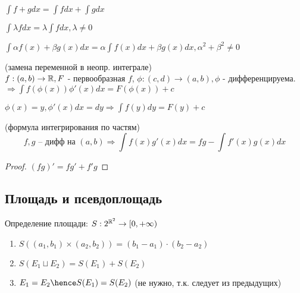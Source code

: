 \begin{properties}
    \item $\int f + g dx = \int f dx + \int g dx$
    
    \item $\int \lambda f dx = \lambda \int f dx, \lambda \neq 0$
        
    \item $\int \alpha f(x) + \beta g(x) dx = \alpha \int f(x) dx + \beta g(x) dx, \alpha^2 + \beta^2 \neq 0$
        
    \item (замена переменной в неопр. интеграле) \\
    $f : (a, b) \rightarrow \mathbb{R}, F$ - первообразная $f$, $\phi:(c, d) \rightarrow (a, b), 
    \phi$ - дифференцируема. \\
    $\Rightarrow \int f(\phi(x))\phi'(x) dx = F(\phi(x)) + c$
    \begin{remark}
        $\phi(x) = y, \phi'(x)dx = dy \Rightarrow \int f(y) dy = F(y) + c$
    \end{remark}

    \item(формула интегрирования по частям) \\
    \[f, g\text{ -- дифф на }(a, b) \Rightarrow \int f(x)g'(x)dx = fg - \int f'(x)g(x)dx\]
    \begin{proof}
        $(fg)' = fg' + f'g$
    \end{proof}

\end{properties}




\subsection{Площадь и псевдоплощадь}

\begin{definition}
    Определение площади: $S : 2 ^ {\mathbb{R} ^ 2} \rightarrow [0, +\infty)$
    \begin{enumerate}
        \item $S((a_1, b_1) \times (a_2, b_2)) = (b_1 - a_1) \cdot (b_2 - a_2)$
        \item $S(E_1 \sqcup E_2) = S(E_1) + S(E_2)$
        \item \sout{$E_1 = E_2 \hence S(E_1) = S(E_2)$} (не нужно, т.к. следует из предыдущих)
    \end{enumerate}
\end{definition}

